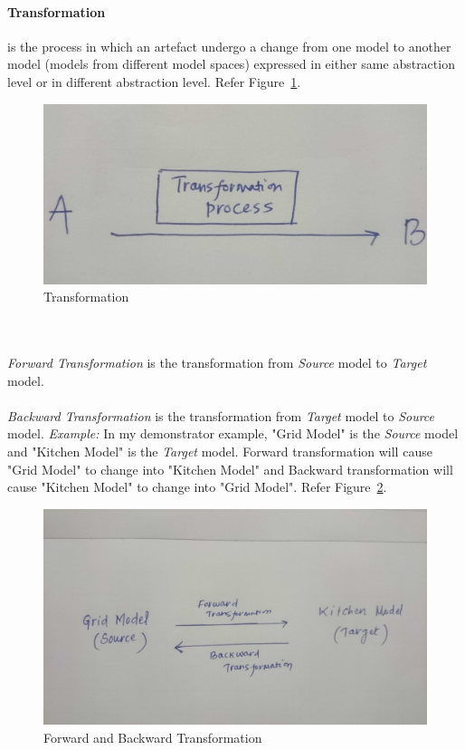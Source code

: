 \paragraph{Transformation} is the process in which an artefact undergo a change from one model to another model (models from different model spaces) expressed in either same abstraction level or in different abstraction level. Refer Figure~\ref{fig:Transformation}.
\begin{figure}
	\includegraphics[width=1\textwidth]{figures/Transformation}
	\caption{Transformation}
	\label{fig:Transformation}
\end{figure}
\\\\\textit{Forward Transformation} is the transformation from \textit{Source} model to \textit{Target} model.
\\\\\textit{Backward Transformation} is the transformation from \textit{Target} model to \textit{Source} model.
\newline\newline\textit{Example:} In my demonstrator example, "Grid Model" is the \textit{Source} model and "Kitchen Model" is the \textit{Target} model. Forward transformation will cause "Grid Model" to change into "Kitchen Model" and Backward transformation will cause "Kitchen Model" to change into "Grid Model". Refer Figure~\ref{fig:FWDBKDTransformation}.
\begin{figure}
	\includegraphics[width=1\textwidth]{figures/FWDBKDTransformation}
	\caption{Forward and Backward Transformation}
	\label{fig:FWDBKDTransformation}
\end{figure}

